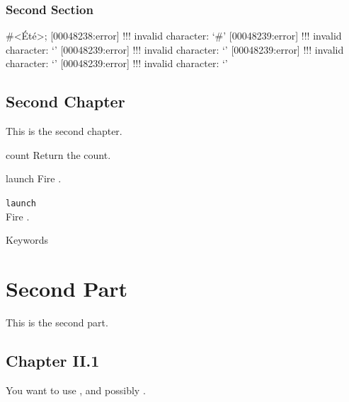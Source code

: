 \documentclass[openright,twoside,11pt]{book}
\begin{document}
\section{Second Section}

\begin{urbiunchecked}[escapeinside=<>]
#<Été>;
[00048238:error] !!! invalid character: `#'
[00048239:error] !!! invalid character: `'
[00048239:error] !!! invalid character: `'
[00048239:error] !!! invalid character: `'
[00048239:error] !!! invalid character: `'
\end{urbiunchecked}

\chapter{Second Chapter}

This is the second chapter.



\begin{urbiscriptapi}
\item[count] Return the count.
\item[launch]
  Fire \this.
\item \lstinline|launch|~\\
  Fire \this.
\end{urbiscriptapi}


\renewcommand{\baselinestretch}{.85}
\begin{table}[\floatpos]
  \centering
    
  \caption{Keywords}
  \label{tab:keywords}
\end{table}
\renewcommand{\baselinestretch}{1}



\let\sectionOrig\section
\renewcommand{\section}[1]{\clearpage\sectionObject{#1}}

\let\section\sectionOrig


\part{Second Part}
\label{sec:second}
This is the second part.

\chapter{Chapter II.1}

You want to use , and possibly .


\nocite{*}

\chapterIndex
\end{document}
